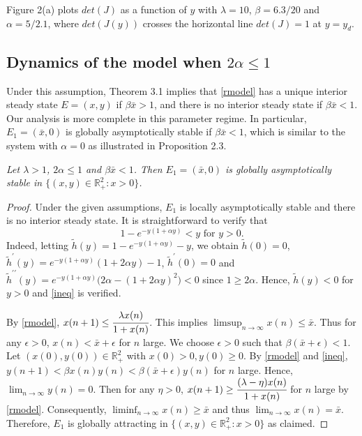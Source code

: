 \documentclass[11pt]{article}
\begin{document}
\medskip

Figure 2(a) plots $det(J)$ as a function of $y$ with $\lambda=10$,
$\beta=6.3/20$ and $\alpha=5/2.1$, where $det(J(y))$ crosses the
horizontal line $det(J)=1$ at $y=y_d$.

\subsection{Dynamics of the model when $2\alpha\leq 1$}

Under this assumption, Theorem 3.1 implies that \eqref{rmodel} has
a unique interior steady state $E=(x, y)$ if $\beta  \bar x>1$,
and there is no interior steady state if $\beta \bar x<1$. Our
analysis is more complete in this parameter regime. In particular,
$E_1=(\bar x,0)$ is globally asymptotically stable if $\beta \bar
x<1$, which is similar to the system with $\alpha=0$ as
illustrated in Proposition 2.3.



\medskip

 {\em Let $\lambda>1$, $ 2\alpha\leq 1$
and $\beta \bar x<1$. Then $E_1=(\bar x, 0)$ is globally
asymptotically stable in $\{(x,y)\in\mathbb{R}_+^2: x>0\}$.}

\begin{proof} Under the given assumptions, $E_1$ is locally asymptotically
stable and there is no interior steady state. It is
straightforward to verify that
\begin{equation}\label{ineq}
1-e^{-y(1+\alpha y)}<y \mbox{ for } y>0.
\end{equation}
Indeed, letting $\tilde h(y)=1-e^{-y(1+\alpha y)}-y$, we obtain
$\tilde h(0)=0$, $\tilde h^\prime(y)=e^{-y(1+\alpha y)}(1+2\alpha
y)-1$, $\tilde h^\prime(0)=0$  and $\tilde
h^{\prime\prime}(y)=e^{-y(1+\alpha y)}\big(2\alpha-(1+2\alpha
y)^2\big)<0$ since $1\geq 2\alpha$. Hence, $\tilde h(y) <0 $ for
$y>0$ and \eqref{ineq} is verified.


By \eqref{rmodel}, $x(n+1)\leq\cfrac{\lambda x(n)}{1+x(n)}$. This
implies $\limsup_{n\rightarrow\infty}x(n)\leq \bar x$. Thus for
any $\epsilon>0$, $x(n)<\bar x+\epsilon$ for $n $ large. We choose
$\epsilon>0$ such that $\beta (\bar x+\epsilon)<1$. Let
$(x(0),y(0))\in \mathbb{R}_+^2$ with $x(0)>0, y(0) \geq 0$. By
\eqref{rmodel} and \eqref{ineq}, $y(n+1)<\beta x(n) y(n)<\beta
(\bar x+\epsilon)y(n)$ for $n $ large.  Hence,
$\lim_{n\rightarrow\infty}y(n)=0$.
 Then for any $\eta>0$, $x(n+1)\geq\cfrac{(\lambda -\eta) x(n)}{1+x(n)}$   for $n $ large by  \eqref{rmodel}.
 Consequently, $\liminf_{n\rightarrow\infty}x(n)\geq \bar x$ and thus $\lim_{n\rightarrow\infty}x(n)=\bar x$. Therefore,  $E_1$ is
globally attracting in $\{(x,y)\in\mathbb{R}_+^2: x>0\}$ as claimed. \end{proof}
\end{document}
